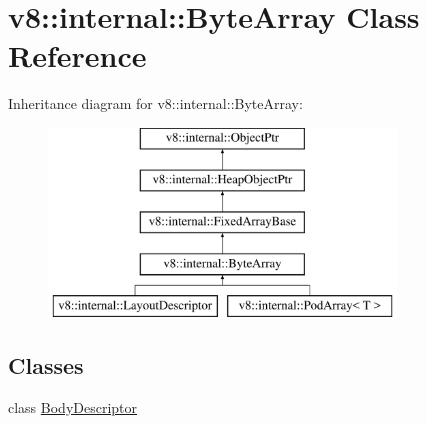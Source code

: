 \hypertarget{classv8_1_1internal_1_1ByteArray}{}\section{v8\+:\+:internal\+:\+:Byte\+Array Class Reference}
\label{classv8_1_1internal_1_1ByteArray}
Inheritance diagram for v8\+:\+:internal\+:\+:Byte\+Array\+:\begin{figure}[H]
\begin{center}
\leavevmode
\includegraphics[height=5.000000cm]{classv8_1_1internal_1_1ByteArray}
\end{center}
\end{figure}
\subsection*{Classes}
\begin{DoxyCompactItemize}
\item 
class \mbox{\hyperlink{classv8_1_1internal_1_1ByteArray_1_1BodyDescriptor}{Body\+Descriptor}}
\end{DoxyCompactItemize}
